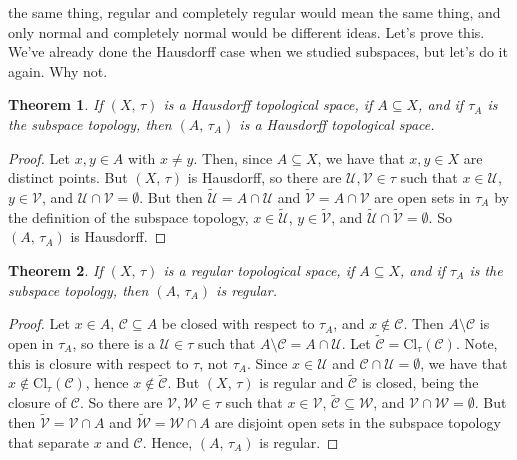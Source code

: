 \documentclass{article}
\theoremstyle{plain}
\newtheorem{theorem}{Theorem}[section]
\theoremstyle{normal}
\begin{document}
        the same thing, regular and completely regular would mean the same
        thing, and only normal and completely normal would be different ideas.
        Let's prove this. We've already done the Hausdorff case when we studied
        subspaces, but let's do it again. Why not.
        \begin{theorem}
            If $(X,\,\tau)$ is a Hausdorff topological space, if
            $A\subseteq{X}$, and if $\tau_{A}$ is the subspace topology, then
            $(A,\,\tau_{A})$ is a Hausdorff topological space.
        \end{theorem}
        \begin{proof}
            Let $x,y\in{A}$ with $x\ne{y}$. Then, since $A\subseteq{X}$, we
            have that $x,y\in{X}$ are distinct points. But $(X,\,\tau)$ is
            Hausdorff, so there are $\mathcal{U},\mathcal{V}\in\tau$ such that
            $x\in\mathcal{U}$, $y\in\mathcal{V}$, and
            $\mathcal{U}\cap\mathcal{V}=\emptyset$. But then
            $\tilde{\mathcal{U}}=A\cap\mathcal{U}$ and
            $\tilde{\mathcal{V}}=A\cap\mathcal{V}$ are open sets in $\tau_{A}$
            by the definition of the subspace topology,
            $x\in\tilde{\mathcal{U}}$, $y\in\tilde{\mathcal{V}}$, and
            $\tilde{\mathcal{U}}\cap\tilde{\mathcal{V}}=\emptyset$. So
            $(A,\,\tau_{A})$ is Hausdorff.
        \end{proof}
        \begin{theorem}
            If $(X,\,\tau)$ is a regular topological space, if
            $A\subseteq{X}$, and if $\tau_{A}$ is the subspace topology,
            then $(A,\,\tau_{A})$ is regular.
        \end{theorem}
        \begin{proof}
            Let $x\in{A}$, $\mathcal{C}\subseteq{A}$ be closed with respect
            to $\tau_{A}$, and $x\notin\mathcal{C}$. Then
            $A\setminus\mathcal{C}$ is open in $\tau_{A}$, so there is a
            $\mathcal{U}\in\tau$ such that
            $A\setminus\mathcal{C}=A\cap\mathcal{U}$. Let
            $\tilde{\mathcal{C}}=\textrm{Cl}_{\tau}(\mathcal{C})$. Note, this
            is closure with respect to $\tau$, not $\tau_{A}$. Since
            $x\in\mathcal{U}$ and $\mathcal{C}\cap\mathcal{U}=\emptyset$, we
            have that $x\not\in\textrm{Cl}_{\tau}(\mathcal{C})$, hence
            $x\notin\tilde{\mathcal{C}}$. But $(X,\,\tau)$ is regular and
            $\tilde{\mathcal{C}}$ is closed, being the closure of $\mathcal{C}$.
            So there are $\mathcal{V},\mathcal{W}\in\tau$ such that
            $x\in\mathcal{V}$, $\tilde{\mathcal{C}}\subseteq\mathcal{W}$, and
            $\mathcal{V}\cap\mathcal{W}=\emptyset$. But then
            $\tilde{\mathcal{V}}=\mathcal{V}\cap{A}$ and
            $\tilde{\mathcal{W}}=\mathcal{W}\cap{A}$ are disjoint open sets in
            the subspace topology that separate $x$ and $\mathcal{C}$.
            Hence, $(A,\,\tau_{A})$ is regular.
        \end{proof}
\end{document}

